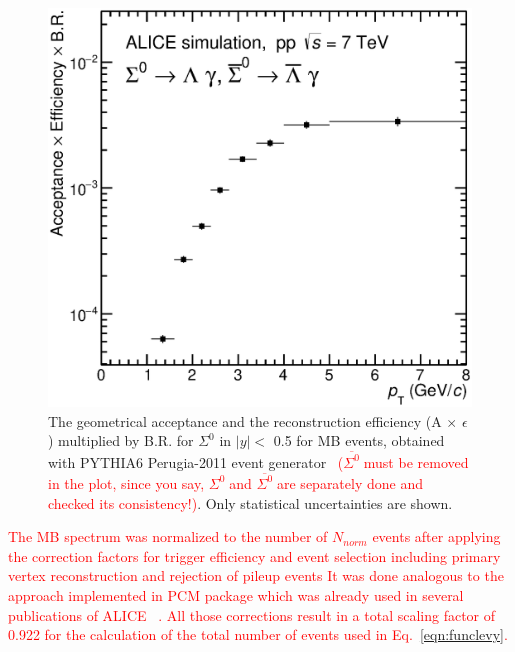 \documentclass[ALICE,manyauthors]{cernphprep}
\newcommand{\sig}{\ensuremath{\Sigma^0  \; }}
\newcommand{\asig}{\ensuremath{\overline{\Sigma^0} \; }}
\newcommand{\red}{\textcolor{red}}
\newcommand{\blue}{\textcolor{blue}}
\begin{document}
\begin{figure}[bt]
\centering  
      \includegraphics[width=10.cm]{Figure/2017oct31-Sigma0-AccEffi.eps}

  \caption{The geometrical acceptance and the reconstruction efficiency
  (A $\times$ $\epsilon$) multiplied by B.R. for $\Sigma^{0}$ in $ |y| <$ 0.5 for 
  MB events, obtained with PYTHIA6 Perugia-2011 event generator~\cite{cite:pythia6}
  \red{(\asig must be removed in the plot, since you say, \sig and \asig are separately done and checked its consistency!)}.
  Only statistical uncertainties are shown.}
  \label{fig:efficiency}
\end{figure}

\red{The MB spectrum was normalized to the number of 
$N_{norm}$ events after applying the correction factors for trigger efficiency and event 
selection including primary vertex reconstruction and rejection of pileup events
It was done analogous to the approach implemented in PCM package which 
was already  used in several publications of ALICE~\cite{cite:ALICE2015-InclPhot-pp,cite:ALICE-DirPhot2016} .
All those corrections result in a total scaling factor of 0.922 for the calculation of the total  
number of events used in Eq.~\ref{eqn:funclevy}.}
\end{document}
